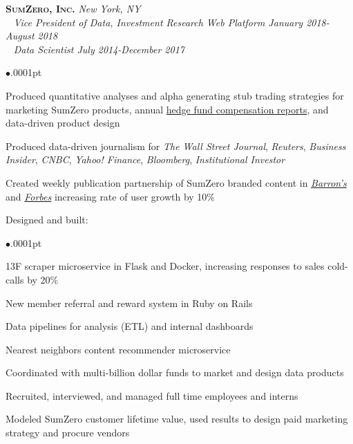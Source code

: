 \documentclass[11pt]{article}
\newcommand{\employer}[4]{
	{\hspace*{-20pt} {\small{\textbf{\textsc{ #1}}}}
  \hfill \small{\emph{#2}}\\ ~\hspace*{-20pt} \small \emph{ #3 \hfill #4}}\\ }
\newcommand{\position}[2]
	{ ~\hspace*{-20pt} \small \emph{ #1 \hfill #2}}
\newenvironment{achievements}{\begin{list}{$\bullet$}{\topsep .0001pt \itemsep -2pt}}{\vspace*{5pt}\end{list} }
\begin{document}
\employer{SumZero, Inc.}{New York, NY}{Vice President of Data, Investment Research Web Platform}{January 2018-August 2018}
\position{Data Scientist}{July 2014-December 2017}
	\begin{achievements}
		\item Produced quantitative analyses and alpha generating stub trading strategies for marketing SumZero products, annual \href{https://sumzero.com/sp/szcomp2017}{hedge fund compensation reports}, and data-driven product design 
		\item Produced data-driven journalism for \emph{The Wall Street Journal}, \emph{Reuters}, \emph{Business Insider}, \emph{CNBC}, \emph{Yahoo! Finance}, \emph{Bloomberg}, \emph{Institutional Investor}
		\item Created weekly publication partnership of SumZero branded content in \href{http://www.barrons.com/search?keyword=view+from+the+buyside+sumzero&numResults=15&sort=date-desc&author=&searchWindow=0&minDate=&maxDate=&source=barrons}{\emph{Barron's}} and \href{https://www.forbes.com/sites/lukeschiefelbein/#7442bc65216e}{\emph{Forbes}} increasing rate of user growth by 10\%
		\item Designed and built:
		\begin{achievements}
		\item 13F scraper microservice in Flask and Docker, increasing responses to sales cold-calls by 20\%
		\item New member referral and reward system in Ruby on Rails
		\item Data pipelines for analysis (ETL) and internal dashboards
		\item Nearest neighbors content recommender microservice
		\end{achievements}
		\item Coordinated with multi-billion dollar funds to market and design data products
		\item Recruited, interviewed, and managed full time employees and interns
		\item Modeled SumZero customer lifetime value, used results to design paid marketing strategy and procure vendors
	\end{achievements}
\end{document}
